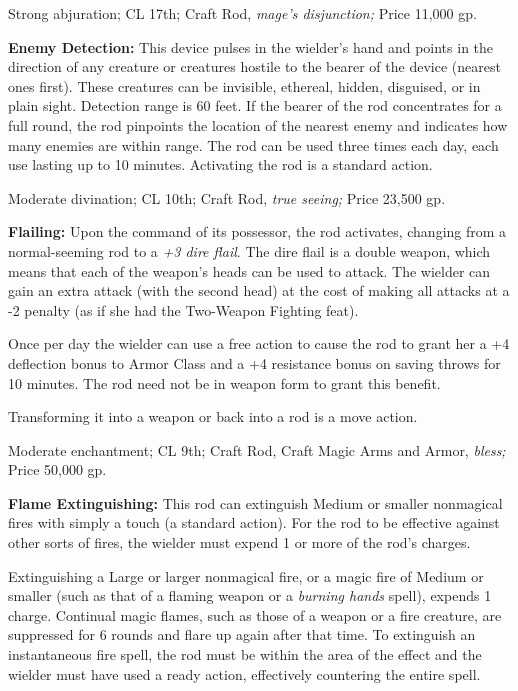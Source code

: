 \documentclass{article}
\begin{document}
Strong abjuration; CL 17th; Craft Rod, \textit{mage's disjunction; }Price 11,000 
gp.

\textbf{Enemy Detection: }This device pulses in the wielder's hand and points in 
the direction of any creature or creatures hostile to the bearer of the device 
(nearest ones first). These creatures can be invisible, ethereal, hidden, disguised, 
or in plain sight. Detection range is 60 feet. If the bearer of the rod concentrates 
for a full round, the rod pinpoints the location of the nearest enemy and indicates 
how many enemies are within range. The rod can be used three times each day, each 
use lasting up to 10 minutes. Activating the rod is a standard action.

Moderate divination; CL 10th; Craft Rod, \textit{true seeing; }Price 23,500 gp.

\textbf{Flailing: }Upon the command of its possessor, the rod activates, changing 
from a normal-seeming rod to a \textit{+3 dire flail}. The dire flail is a double 
weapon, which means that each of the weapon's heads can be used to attack. The 
wielder can gain an extra attack (with the second head) at the cost of making all 
attacks at a -2 penalty (as if she had the Two-Weapon Fighting feat).

Once per day the wielder can use a free action to cause the rod to grant her a 
+4 deflection bonus to Armor Class and a +4 resistance bonus on saving throws for 
10 minutes. The rod need not be in weapon form to grant this benefit.

Transforming it into a weapon or back into a rod is a move action.

Moderate enchantment; CL 9th; Craft Rod, Craft Magic Arms and Armor, \textit{bless; 
}Price 50,000 gp.

\textbf{Flame Extinguishing: }This rod can extinguish Medium or smaller nonmagical 
fires with simply a touch (a standard action). For the rod to be effective against 
other sorts of fires, the wielder must expend 1 or more of the rod's charges.

Extinguishing a Large or larger nonmagical fire, or a magic fire of Medium or smaller 
(such as that of a flaming weapon or a \textit{burning hands }spell), expends 1 
charge. Continual magic flames, such as those of a weapon or a fire creature, are 
suppressed for 6 rounds and flare up again after that time. To extinguish an instantaneous 
fire spell, the rod must be within the area of the effect and the wielder must 
have used a ready action, effectively countering the entire spell.
\end{document}
